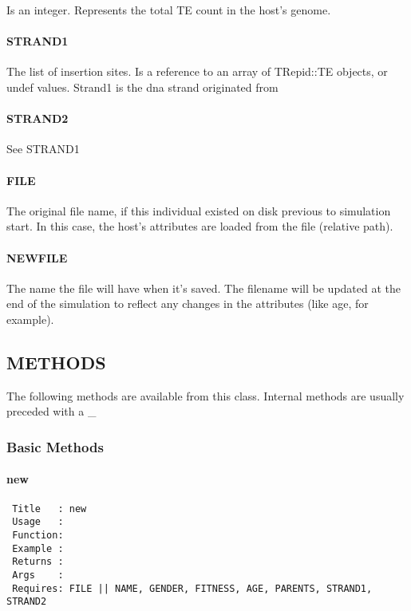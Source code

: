 Is an integer. Represents the total TE count in the host's genome.

\paragraph*{STRAND1\label{STRAND1}}


The list of insertion sites. Is a reference to an array of TRepid::TE
objects, or undef values. Strand1 is the dna strand originated from

\paragraph*{STRAND2\label{STRAND2}}


See STRAND1

\paragraph*{FILE\label{FILE}}


The original file name, if this individual existed on disk previous to
simulation start. In this case, the host's attributes are loaded from
the file (relative path).

\paragraph*{NEWFILE\label{NEWFILE}}


The name the file will have when it's saved. The filename will be
updated at the end of the simulation to reflect any changes in the
attributes (like age, for example).

\subsection{METHODS\label{METHODS}}


The following methods are available from this class. Internal methods
are usually preceded with a \_

\subsubsection*{Basic Methods\label{Basic_Methods}}
\paragraph*{new\label{new}}
\begin{verbatim}
 Title   : new
 Usage   :
 Function: 
 Example :
 Returns :
 Args    :
 Requires: FILE || NAME, GENDER, FITNESS, AGE, PARENTS, STRAND1, STRAND2
\end{verbatim}
